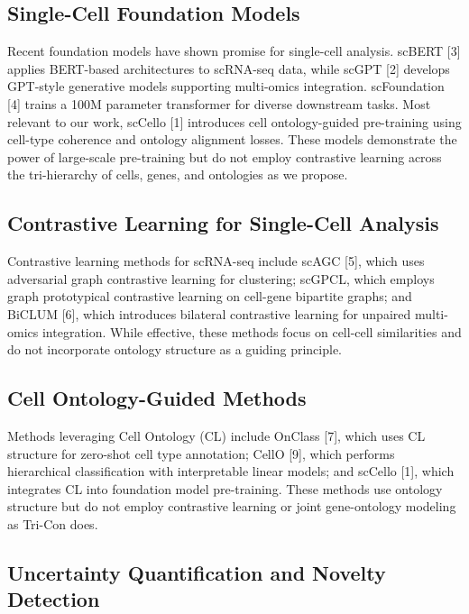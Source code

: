 \documentclass[11pt]{article}
\begin{document}
\subsection{Single-Cell Foundation Models}

Recent foundation models have shown promise for single-cell analysis. scBERT [3] applies BERT-based architectures to scRNA-seq data, while scGPT [2] develops GPT-style generative models supporting multi-omics integration. scFoundation [4] trains a 100M parameter transformer for diverse downstream tasks. Most relevant to our work, scCello [1] introduces cell ontology-guided pre-training using cell-type coherence and ontology alignment losses. These models demonstrate the power of large-scale pre-training but do not employ contrastive learning across the tri-hierarchy of cells, genes, and ontologies as we propose.

\subsection{Contrastive Learning for Single-Cell Analysis}

Contrastive learning methods for scRNA-seq include scAGC [5], which uses adversarial graph contrastive learning for clustering; scGPCL, which employs graph prototypical contrastive learning on cell-gene bipartite graphs; and BiCLUM [6], which introduces bilateral contrastive learning for unpaired multi-omics integration. While effective, these methods focus on cell-cell similarities and do not incorporate ontology structure as a guiding principle.

\subsection{Cell Ontology-Guided Methods}

Methods leveraging Cell Ontology (CL) include OnClass [7], which uses CL structure for zero-shot cell type annotation; CellO [9], which performs hierarchical classification with interpretable linear models; and scCello [1], which integrates CL into foundation model pre-training. These methods use ontology structure but do not employ contrastive learning or joint gene-ontology modeling as Tri-Con does.

\subsection{Uncertainty Quantification and Novelty Detection}
\end{document}
